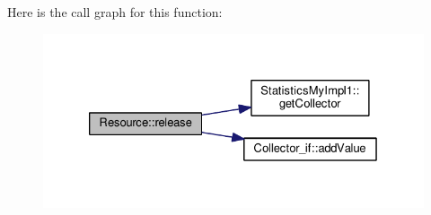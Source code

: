 Here is the call graph for this function\-:
\nopagebreak
\begin{figure}[H]
\begin{center}
\leavevmode
\includegraphics[width=326pt]{class_resource_ad5da4dca5dd48a4818827e6273c20c2d_cgraph}
\end{center}
\end{figure}


